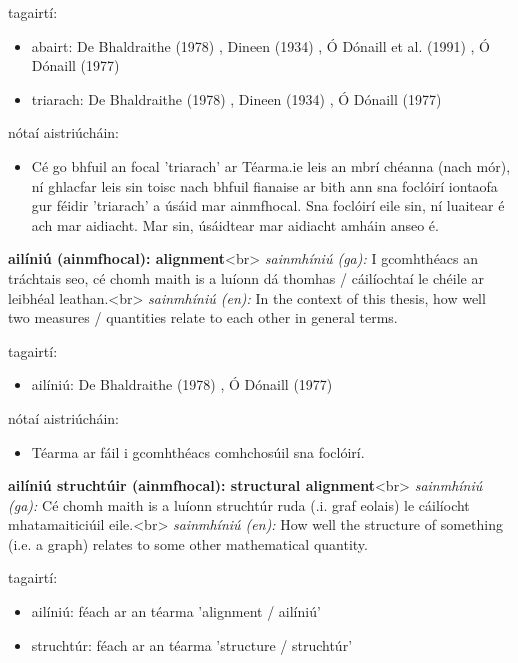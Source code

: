 \documentclass{article}
\begin{document}
tagairtí:
\begin{itemize}
	\item abairt: De Bhaldraithe (1978) \cite{de-bhaldraithe}, Dineen (1934) \cite{dineen}, Ó Dónaill et al. (1991) \cite{focloir-beag}, Ó Dónaill (1977) \cite{odonaill}
	\item triarach: De Bhaldraithe (1978) \cite{de-bhaldraithe}, Dineen (1934) \cite{dineen}, Ó Dónaill (1977) \cite{odonaill}
\end{itemize}

nótaí aistriúcháin:
\begin{itemize}
	\item Cé go bhfuil an focal 'triarach' ar Téarma.ie leis an mbrí chéanna (nach mór), ní ghlacfar leis sin toisc nach bhfuil fianaise ar bith ann sna foclóirí iontaofa gur féidir 'triarach' a úsáid mar ainmfhocal. Sna foclóirí eile sin, ní luaitear é ach mar aidiacht. Mar sin, úsáidtear mar aidiacht amháin anseo é.
\end{itemize}


\textbf{ailíniú (ainmfhocal): alignment}<br>
\textit{sainmhíniú (ga):} I gcomhthéacs an tráchtais seo, cé chomh maith is a luíonn dá thomhas / cáilíochtaí le chéile ar leibhéal leathan.<br>
\textit{sainmhíniú (en):} In the context of this thesis, how well two measures / quantities relate to each other in general terms.

tagairtí:
\begin{itemize}
	\item ailíniú: De Bhaldraithe (1978) \cite{de-bhaldraithe}, Ó Dónaill (1977) \cite{odonaill}
\end{itemize}

nótaí aistriúcháin:
\begin{itemize}
	\item Téarma ar fáil i gcomhthéacs comhchosúil sna foclóirí.
\end{itemize}


\textbf{ailíniú struchtúir (ainmfhocal): structural alignment}<br>
\textit{sainmhíniú (ga):} Cé chomh maith is a luíonn struchtúr ruda (.i. graf eolais) le cáilíocht mhatamaiticiúil eile.<br>
\textit{sainmhíniú (en):} How well the structure of something (i.e. a graph) relates to some other mathematical quantity.

tagairtí:
\begin{itemize}
	\item ailíniú: féach ar an téarma 'alignment / ailíniú'
	\item struchtúr: féach ar an téarma 'structure / struchtúr'
\end{itemize}
\end{document}

